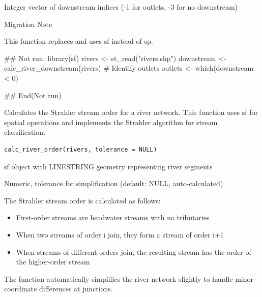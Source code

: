 \documentclass[a4paper]{book}
\begin{document}
%
\begin{Value}
Integer vector of downstream indices (-1 for outlets, -3 for no downstream)
\end{Value}
%
\begin{Section}{Migration Note}

This function replaces  and uses sf instead of sp.
\end{Section}
%
\begin{Examples}
\begin{ExampleCode}
## Not run: 
library(sf)
rivers <- st_read("rivers.shp")
downstream <- calc_river_downstream(rivers)
# Identify outlets
outlets <- which(downstream < 0)

## End(Not run)
\end{ExampleCode}
\end{Examples}
%
\begin{Description}\relax
Calculates the Strahler stream order for a river network. This function
uses sf for spatial operations and implements the Strahler algorithm
for stream classification.
\end{Description}
%
\begin{Usage}
\begin{verbatim}
calc_river_order(rivers, tolerance = NULL)
\end{verbatim}
\end{Usage}
%
\begin{Arguments}
\begin{ldescription}
\item[\code{rivers}] sf object with LINESTRING geometry representing river segments

\item[\code{tolerance}] Numeric, tolerance for simplification (default: NULL, auto-calculated)
\end{ldescription}
\end{Arguments}
%
\begin{Details}\relax
The Strahler stream order is calculated as follows:
\begin{itemize}

\item{} First-order streams are headwater streams with no tributaries
\item{} When two streams of order i join, they form a stream of order i+1
\item{} When streams of different orders join, the resulting stream has the
order of the higher-order stream

\end{itemize}


The function automatically simplifies the river network slightly to
handle minor coordinate differences at junctions.
\end{Details}
\end{document}

